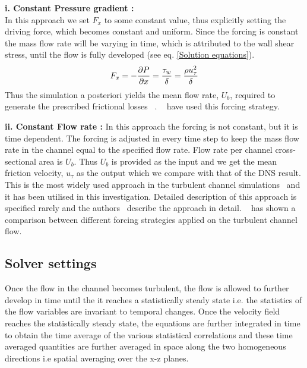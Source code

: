 \textbf{i. Constant Pressure gradient :}\\ In this approach we set $F_x$ to some constant value, thus explicitly setting the driving force, which becomes constant and uniform. 
Since the forcing is constant the mass flow rate will be varying in time, which is attributed to the wall shear stress, until the flow is fully developed (see eq. \ref{Solution equations}).
%
\begin{equation}
\label{CPG}
F_x = -\frac{\partial P}{\partial x} = \frac{\tau_w}{\delta} = \frac{\rho u_\tau^2}{\delta}
\end{equation}
%
Thus the simulation a posteriori yields the mean flow rate, $U_b$, required to generate the prescribed frictional losses ~\cite{Quadrioa:15}. ~\cite{KPremnath:09, Freitas:11} have used this forcing strategy.

\textbf{ii. Constant Flow rate :} In this approach the forcing is not constant, but it is time dependent. The forcing is adjusted in every time step to keep the mass flow rate in the channel equal to the specified flow rate. Flow rate per channel cross-sectional area is $U_b$. Thus $U_b$ is provided as the input and we get the mean friction velocity, $u_\tau$ as the output which we compare with that of the DNS result. This is the most widely used approach in the turbulent channel simulations~\cite{devilliers:phd, sonja:12, roos:book} and it has been utilised in this investigation. Detailed description of this approach is specified rarely and the authors~\cite{Quadrioa:15, Lenormanda:00} describe the approach in detail. ~\cite{Quadrioa:15} has shown a comparison between different forcing strategies applied on the turbulent channel flow.

\subsection{Solver settings}
Once the flow in the channel becomes turbulent, the flow is allowed to further develop in time until the it reaches a statistically steady state i.e. the statistics of the flow variables are invariant to temporal changes. Once the velocity field reaches the statistically steady state, the equations are further integrated in time to obtain the time average of the various statistical correlations and these time averaged quantities are further averaged in space along the two homogeneous directions i.e spatial averaging over the x-z planes. 

